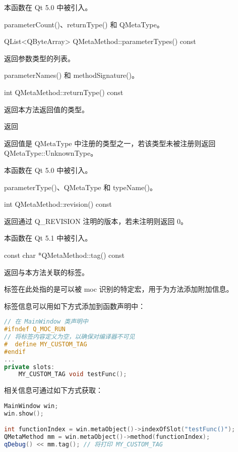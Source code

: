 本函数在 Qt 5.0 中被引入。

\begin{notice}[另请参阅]
parameterCount()、returnType() 和 QMetaType。
\end{notice}

QList<QByteArray> QMetaMethod::parameterTypes() const

返回参数类型的列表。

\begin{notice}[另请参阅]
parameterNames() 和 methodSignature()。
\end{notice}

int QMetaMethod::returnType() const

返回本方法返回值的类型。

返回

返回值是 QMetaType 中注册的类型之一，若该类型未被注册则返回 QMetaType::UnknownType。

本函数在 Qt 5.0 中被引入。

\begin{notice}[另请参阅]
parameterType()、QMetaType 和 typeName()。
\end{notice}

int QMetaMethod::revision() const

返回通过 Q\_REVISION 注明的版本，若未注明则返回 0。

本函数在 Qt 5.1 中被引入。

const char *QMetaMethod::tag() const

返回与本方法关联的标签。

标签在此处指的是可以被 moc 识别的特定宏，用于为方法添加附加信息。

标签信息可以用如下方式添加到函数声明中：

\begin{lstlisting}[language=C++]
// 在 MainWindow 类声明中
#ifndef Q_MOC_RUN
// 将标签内容定义为空，以确保对编译器不可见
#  define MY_CUSTOM_TAG
#endif
...
private slots:
	MY_CUSTOM_TAG void testFunc();
\end{lstlisting}

相关信息可通过如下方式获取：

\begin{lstlisting}[language=C++]
MainWindow win;
win.show();

int functionIndex = win.metaObject()->indexOfSlot("testFunc()");
QMetaMethod mm = win.metaObject()->method(functionIndex);
qDebug() << mm.tag(); // 将打印 MY_CUSTOM_TAG
\end{lstlisting}

